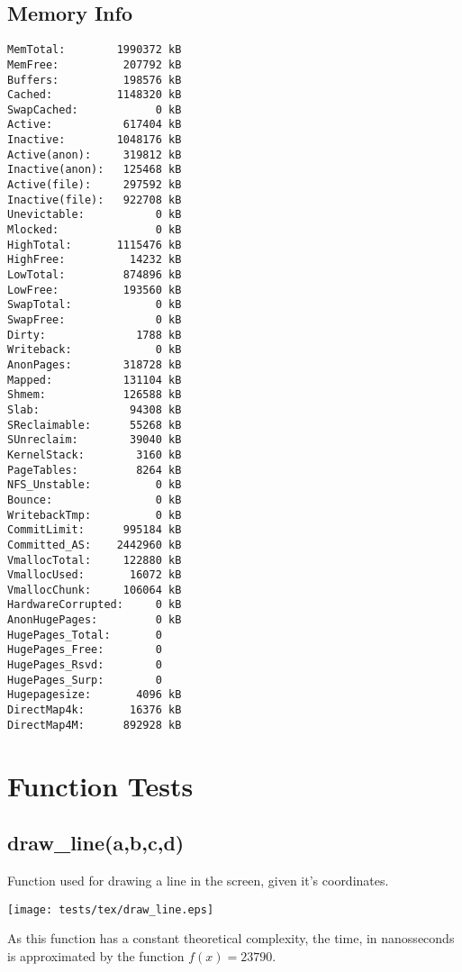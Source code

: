\documentclass{article}
\begin{document}
\subsection{Memory Info}
\begin{verbatim}
MemTotal:        1990372 kB
MemFree:          207792 kB
Buffers:          198576 kB
Cached:          1148320 kB
SwapCached:            0 kB
Active:           617404 kB
Inactive:        1048176 kB
Active(anon):     319812 kB
Inactive(anon):   125468 kB
Active(file):     297592 kB
Inactive(file):   922708 kB
Unevictable:           0 kB
Mlocked:               0 kB
HighTotal:       1115476 kB
HighFree:          14232 kB
LowTotal:         874896 kB
LowFree:          193560 kB
SwapTotal:             0 kB
SwapFree:              0 kB
Dirty:              1788 kB
Writeback:             0 kB
AnonPages:        318728 kB
Mapped:           131104 kB
Shmem:            126588 kB
Slab:              94308 kB
SReclaimable:      55268 kB
SUnreclaim:        39040 kB
KernelStack:        3160 kB
PageTables:         8264 kB
NFS_Unstable:          0 kB
Bounce:                0 kB
WritebackTmp:          0 kB
CommitLimit:      995184 kB
Committed_AS:    2442960 kB
VmallocTotal:     122880 kB
VmallocUsed:       16072 kB
VmallocChunk:     106064 kB
HardwareCorrupted:     0 kB
AnonHugePages:         0 kB
HugePages_Total:       0
HugePages_Free:        0
HugePages_Rsvd:        0
HugePages_Surp:        0
Hugepagesize:       4096 kB
DirectMap4k:       16376 kB
DirectMap4M:      892928 kB
\end{verbatim}
\section{Function Tests}
\subsection{draw\_line(a,b,c,d)}
Function used for drawing a line in the
screen, given it's coordinates. 

\texttt{[image: tests/tex/draw\_line.eps]}

As this function has a constant theoretical
complexity, the time, in nanosseconds is 
approximated by the function $f(x)=23790$.
\end{document}
